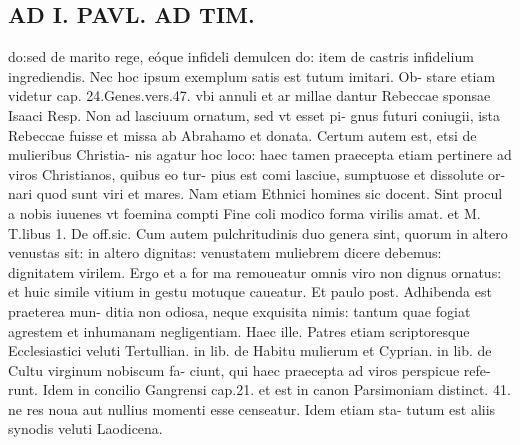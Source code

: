 \documentclass{article}
\begin{document}
\begin{pages}
\section*{AD I. PAVL. AD TIM. }
\marginpar{[ p.78 ]}\pstart do:sed de marito rege, eóque infideli demulcen do: item de castris infidelium ingrediendis. Nec hoc ipsum exemplum satis est tutum imitari. Ob- stare etiam videtur cap. 24.Genes.vers.47. vbi annuli et ar millae dantur Rebeccae sponsae Isaaci Resp. Non ad lasciuum ornatum, sed vt esset pi- gnus futuri coniugii, ista Rebeccae fuisse et missa ab Abrahamo et donata. Certum autem est, etsi de mulieribus Christia- nis agatur hoc loco: haec tamen praecepta etiam pertinere ad viros Christianos, quibus eo tur- pius est comi lasciue, sumptuose et dissolute or- nari quod sunt viri et mares. Nam etiam Ethnici homines sic docent. Sint procul a nobis iuuenes vt foemina compti Fine coli modico forma virilis amat. et M. T.libus 1. De off.sic. Cum autem pulchritudinis duo genera sint, quorum in altero venustas sit: in altero dignitas: venustatem muliebrem dicere debemus: dignitatem virilem. Ergo et a for ma remoueatur omnis viro non dignus ornatus: et huic simile vitium in gestu motuque caueatur. Et paulo post. Adhibenda est praeterea mun- ditia non odiosa, neque exquisita nimis: tantum quae fogiat agrestem et inhumanam negligentiam. Haec ille. Patres etiam scriptoresque Ecclesiastici veluti Tertullian. in lib.  de Habitu mulierum et Cyprian. in lib.  de Cultu virginum nobiscum fa- ciunt, qui haec praecepta ad viros perspicue refe- runt. Idem in concilio Gangrensi cap.21. et est in canon Parsimoniam distinct. 41. ne res noua aut nullius momenti esse censeatur. Idem etiam sta- tutum est aliis synodis veluti Laodicena.  \pend

\end{pages}
\end{document}
